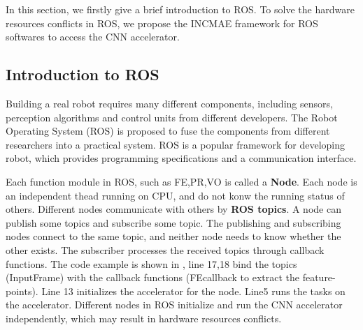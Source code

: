 \label{sec:incame}

In this section, we firstly give a brief introduction to ROS\cite{quigley2009ros}. To solve the hardware resources conflicts in ROS, we propose the INCMAE framework for ROS softwares to access the CNN accelerator.




\subsection{Introduction to ROS}
Building a real robot requires many different components, including sensors, perception algorithms and control units from different developers. The Robot Operating System (ROS) \cite{quigley2009ros} is proposed to fuse the components from different researchers into a practical system. ROS is a popular framework for developing robot, which provides programming specifications and a communication interface.

Each function module in ROS, such as FE,PR,VO is called a \textbf{Node}. Each node is an independent thead running on CPU, and  do not konw the running status of others. Different nodes communicate with others by \textbf{ROS topics}. A node can publish some topics and subscribe some topic. The publishing and subscribing nodes connect to the same topic, and neither node needs to know whether the other exists. The subscriber processes the received topics through callback functions. The code example is shown in , line 17,18 bind the topics (InputFrame) with the callback functions (FEcallback to extract the feature-points). Line 13 initializes the accelerator for the node. Line5 runs the tasks on the accelerator. Different nodes in ROS initialize and run the CNN accelerator independently, which may result in hardware resources conflicts.






